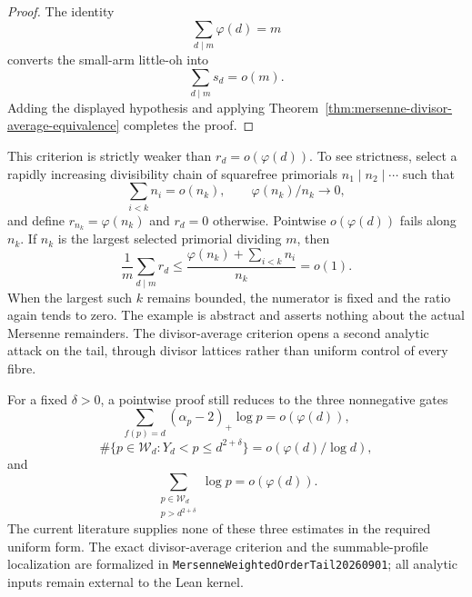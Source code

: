 \begin{proof}
The identity
\[
 \sum_{d\mid m}\varphi(d)=m
\]
converts the small-arm little-oh into
\[
 \sum_{d\mid m}s_d=o(m).
\]
Adding the displayed hypothesis and applying
Theorem~\ref{thm:mersenne-divisor-average-equivalence} completes the proof.
\end{proof}

This criterion is strictly weaker than $r_d=o(\varphi(d))$.  To see
strictness, select a rapidly increasing divisibility chain of squarefree
primorials $n_1\mid n_2\mid\cdots$ such that
\[
 \sum_{i<k}n_i=o(n_k),\qquad
 \varphi(n_k)/n_k\longrightarrow0,
\]
and define $r_{n_k}=\varphi(n_k)$ and $r_d=0$ otherwise.  Pointwise
$o(\varphi(d))$ fails along $n_k$.  If $n_k$ is the largest selected
primorial dividing $m$, then
\[
 \frac1m\sum_{d\mid m}r_d
 \le
 \frac{\varphi(n_k)+\sum_{i<k}n_i}{n_k}=o(1).
\]
When the largest such $k$ remains bounded, the numerator is fixed and the
ratio again tends to zero.  The example is abstract and asserts nothing
about the actual Mersenne remainders.  The divisor-average criterion opens
a second analytic attack on the tail, through divisor lattices rather than
uniform control of every fibre.

For a fixed $\delta>0$, a pointwise proof still reduces to the three
nonnegative gates
\[
 \sum_{f(p)=d}(\alpha_p-2)_+\log p=o(\varphi(d)),
\]
\[
 \#\{p\in\mathcal W_d:Y_d<p\le d^{2+\delta}\}
       =o(\varphi(d)/\log d),
\]
and
\[
 \sum_{\substack{p\in\mathcal W_d\\p>d^{2+\delta}}}\log p
       =o(\varphi(d)).
\]
The current literature supplies none of these three estimates in the
required uniform form.  The exact divisor-average criterion and the
summable-profile localization are formalized in
\texttt{MersenneWeightedOrderTail20260901}; all analytic inputs remain
external to the Lean kernel.
